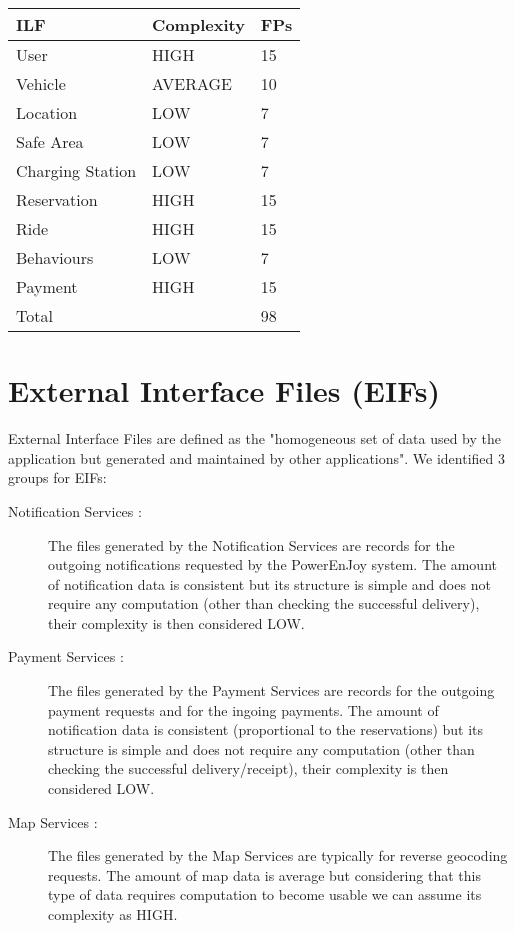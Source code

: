 \begin{center}
  \begin{tabular}{ |l|l|l| }
    \hline
    ILF & Complexity & FPs \\ \hline
    User & HIGH & 15 \\ \hline
    Vehicle & AVERAGE & 10 \\ \hline
    Location & LOW & 7 \\ \hline
    Safe Area & LOW & 7 \\ \hline
    Charging Station & LOW & 7 \\ \hline
    Reservation & HIGH & 15 \\ \hline
    Ride & HIGH & 15 \\ \hline
    Behaviours & LOW & 7 \\ \hline
    Payment & HIGH & 15 \\ \hline
    \multicolumn{2}{|l|}{Total} & 98 \\ \hline
  \end{tabular}
\end{center}


\newpage
\section{External Interface Files (EIFs)}
External Interface Files are defined as the "homogeneous set of data used by the application but generated and maintained by other applications". We identified 3 groups for EIFs: \\

\begin{description}
	\item [Notification Services :] The files generated by the Notification Services are records for the outgoing notifications requested by the PowerEnJoy system. The amount of notification data is consistent but its structure is simple and does not require any computation (other than checking the successful delivery), their complexity is then considered LOW.
	\item [Payment Services :] The files generated by the Payment Services are records for the outgoing payment requests and for the ingoing payments. The amount of notification data is consistent (proportional to the reservations) but its structure is simple and does not require any computation (other than checking the successful delivery/receipt), their complexity is then considered LOW.
	\item [Map Services :] The files generated by the Map Services are typically for reverse geocoding requests. The amount of map data is average but considering that this type of data requires computation to become usable we can assume its complexity as HIGH.
\end{description}

